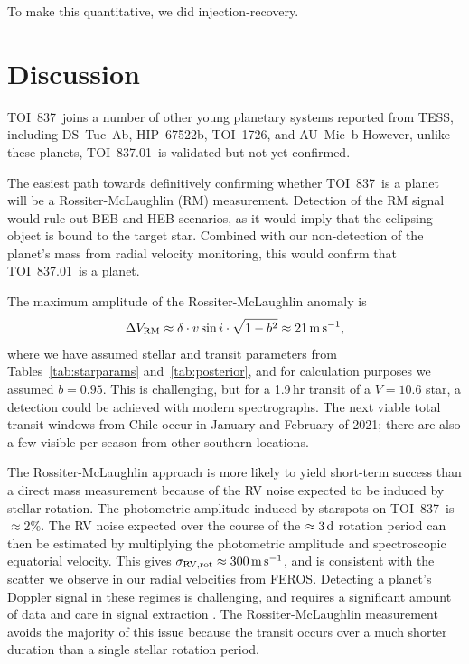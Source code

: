 \documentclass[12pt,twocolumn,tighten]{aastex63}
\newcommand{\tn}{TOI~837} %
\newcommand{\pn}{TOI~837.01} %
\begin{document}
To make this quantitative, we did injection-recovery.



\section{Discussion}
\label{sec:discussion}

\tn\ joins a number of other young planetary systems reported from
TESS, including DS~Tuc~Ab, HIP~67522b, TOI~1726, and AU~Mic~b
\citep{newton_tess_2019,zhou_well_2019,montet_young_2019,rizzuto_tess_2020,mann_tess_2020,plavchan_planet_2020,palle_transmission_2020,addison_youngest_2020,martioli_magnetism_2020,hirano_limits_2020}
However, unlike these planets, \pn\ is validated but not yet confirmed.

The easiest path towards definitively confirming
whether \tn\ is a planet will be a Rossiter-McLaughlin (RM) measurement.  
Detection of the RM signal
would rule out BEB and HEB scenarios, as it would imply that the
eclipsing object is bound to the target star. Combined with our
non-detection of the planet's mass from radial velocity monitoring,
this would confirm that \pn\ is a planet.

The maximum amplitude of the Rossiter-McLaughlin anomaly is
\citep{winn_exoplanet_2010}
\begin{equation}
  \Delta V_{\rm RM} \approx \delta \cdot v\sin i \cdot \sqrt{1-b^2}
  \approx 21\,{\rm m\,s}^{-1},
\end{equation}
where we have assumed stellar and transit parameters from
Tables~\ref{tab:starparams} and~\ref{tab:posterior}, and for
calculation purposes we assumed $b=0.95$.  This is challenging, but
for a 1.9$\,$hr transit of a $V=10.6$ star, a detection could be achieved
with modern spectrographs.  The next viable total transit windows from
Chile occur in January and February of 2021; there are also a few
visible per season from other southern locations.

The Rossiter-McLaughlin approach is more likely to yield short-term
success than a direct mass measurement because of the RV noise
expected to be induced by stellar rotation.  The photometric amplitude
induced by starspots on \tn\ is $\approx 2\%$. 
The RV noise expected over the course of the $\approx 3\,{\rm d}$
rotation period can then be estimated by multiplying the photometric amplitude and
spectroscopic equatorial velocity.  This gives $\sigma_{\rm RV,rot}
\approx 300\,{\rm m\,s}^{-1}$, and is consistent with the scatter we
observe in our radial velocities from FEROS.  Detecting
a planet's Doppler signal in these regimes is
challenging, and requires a significant amount of data and care in
signal extraction \citep{barragan_radial_2019}.  The
Rossiter-McLaughlin measurement avoids the majority of this issue
because the transit occurs over a much shorter duration than a single
stellar rotation period.  
\end{document}
